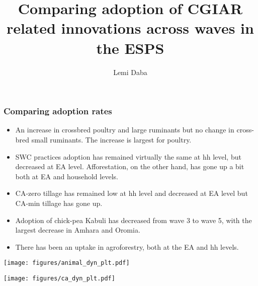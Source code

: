 \documentclass[11pt]{beamer}
\begin{document}
\author{Lemi Daba}
\title{Comparing adoption of CGIAR related innovations across waves in the ESPS}
\begin{frame}[plain]
	\maketitle
\end{frame}

\begin{frame}
\label{frstpg}
\frametitle{Comparing adoption rates}
\begin{itemize}
\item An increase in crossbred poultry and large ruminants but no change in cross-bred small ruminants. The increase is largest for poultry. \hyperlink{animaldynplt}{}

\item SWC practices adoption has remained virtually the same at hh level, but decreased at EA level. Afforestation, on the other hand, has gone up a bit both at EA and household levels. \hyperlink{swcaffdynplt}{}

\item CA-zero tillage has remained low at hh level and decreased at EA level but CA-min tillage has gone up. \hyperlink{cadynplt}{}

\item Adoption of chick-pea Kabuli has decreased from wave 3 to wave 5, with the largest decrease in Amhara and Oromia.  \hyperlink{kabulidynplt}{}

\item There has been an uptake in agroforestry, both at the EA and hh levels. \hyperlink{agroforestdynplt}{}

\end{itemize}

\end{frame}


\begin{frame}
\label{animaldynplt}
\texttt{[image: figures/animal\_dyn\_plt.pdf]}
\hyperlink{frstpg}{}
\end{frame}


\begin{frame}
\label{cadynplt}
\texttt{[image: figures/ca\_dyn\_plt.pdf]}
\hyperlink{frstpg}{}
\end{frame}
\end{document}
